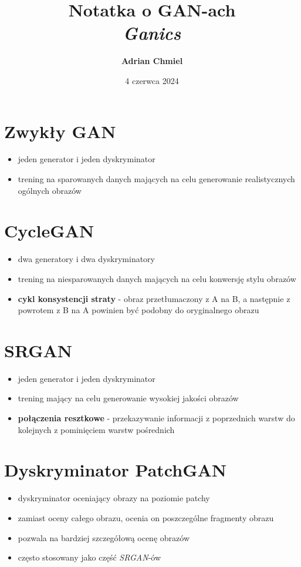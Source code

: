 \documentclass{article}
\begin{document}
\title{\textbf{Notatka o GAN-ach}
\\ \large{\textit{Ganics}}}
\author{\textbf{Adrian Chmiel}}
\date{4 czerwca 2024}
\maketitle

\section{Zwykły GAN}
\begin{itemize}
    \item jeden generator i jeden dyskryminator
    \item trening na sparowanych danych mających na celu generowanie realistycznych ogólnych obrazów
\end{itemize}

\section{CycleGAN}
\begin{itemize}
    \item dwa generatory i dwa dyskryminatory
    \item trening na niesparowanych danych mających na celu konwersję stylu obrazów
    \item \textbf{cykl konsystencji straty} - obraz przetłumaczony z A na B, a następnie z powrotem z B na A powinien być podobny do oryginalnego obrazu
\end{itemize}

\section{SRGAN}
\begin{itemize}
    \item jeden generator i jeden dyskryminator
    \item trening mający na celu generowanie wysokiej jakości obrazów
    \item \textbf{połączenia resztkowe} - przekazywanie informacji z poprzednich warstw do kolejnych z pominięciem warstw pośrednich
\end{itemize}

\section{Dyskryminator PatchGAN}
\begin{itemize}
    \item dyskryminator oceniający obrazy na poziomie patchy
    \item zamiast oceny całego obrazu, ocenia on poszczególne fragmenty obrazu
    \item pozwala na bardziej szczegółową ocenę obrazów
    \item często stosowany jako część \textit{SRGAN}-ów
\end{itemize}
\end{document}
